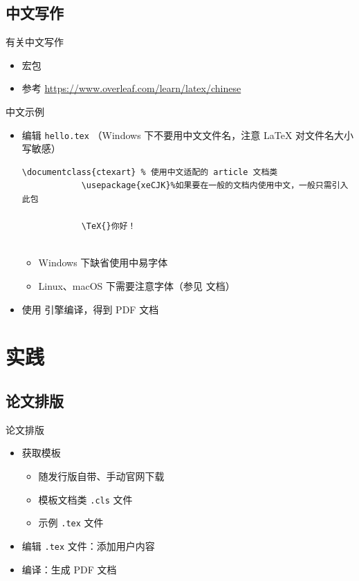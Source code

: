 \subsection{中文写作}
\begin{frame}{有关中文写作}
\begin{itemize}
    \item 宏包 
    \item 参考 \url{https://www.overleaf.com/learn/latex/chinese}
\end{itemize}
\end{frame}

\begin{frame}[fragile]{中文示例}
  
    \begin{itemize}
        \item 编辑 \texttt{hello.tex} （Windows 下不要用中文文件名，注意
        \LaTeX{} 对文件名大小写敏感）
        \lstset{language=[LaTeX]TeX}
        \begin{lstlisting}[basicstyle=\ttfamily]
            \documentclass{ctexart} % 使用中文适配的 article 文档类
            \usepackage{xeCJK}%如果要在一般的文档内使用中文，一般只需引入此包
            
            \TeX{}你好！
            
          \end{lstlisting}
        \begin{itemize}
          \item Windows 下缺省使用中易字体
          \item Linux、macOS 下需要注意字体（参见  文档）
        \end{itemize}
      \item 使用 \XeLaTeX{} 引擎编译，得到 PDF 文档
        \begin{center}
        \end{center}
    \end{itemize}
\end{frame}
  

\section{实践}
\subsection{论文排版}
\begin{frame}{论文排版}
    \begin{itemize}
      \item 获取模板
        \begin{itemize}
          \item 随发行版自带、手动官网下载
          \item 模板文档类 \texttt{.cls} 文件
          \item 示例 \texttt{.tex} 文件
        \end{itemize}
      \item 编辑 \texttt{.tex} 文件：添加用户内容
      \item 编译：生成 PDF 文档
    \end{itemize}
  \end{frame}
  
